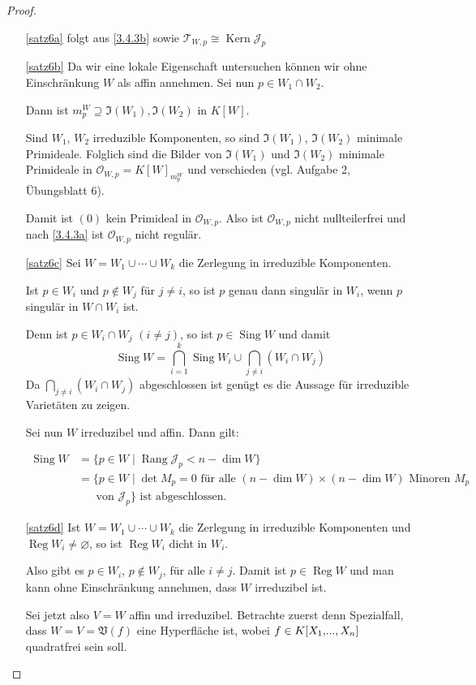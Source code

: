 \documentclass[a4paper,12pt]{scrbook}
\theoremstyle{keinenummern} %
\theoremstyle{mitnummern}
\theoremstyle{unserbeweis}
\newtheorem{proof}{Beweis}
\def\V{\mathfrak{V}}
\def\I{\mathfrak{I}}
\def\O{\mathcal{O}}
\newcommand{\J}{\mathcal{J}}
\def\T{\mathcal{T}}
\newcommand{\Kern}{\operatorname{Kern}}
\newcommand{\Rang}{\operatorname{Rang}}
\newcommand{\Sing}{\operatorname{Sing}}
\newcommand{\Reg}{\operatorname{Reg}}
\newcommand{\leer}{\ensuremath{\varnothing}}
\renewcommand{\dotsc}{\ensuremath{\!...}}
\newcommand{\polyx}[1][n]{\ensuremath%
  [X_{1},\dotsc,X_{#1}]}
\begin{document}
\begin{proof}
  \begin{enumerate}
  \item[\ref{satz6a}] folgt aus \cref{3.4.3b} sowie $\T_{W,p}\cong \Kern \J_p$
  \item[\ref{satz6b}] Da wir eine lokale Eigenschaft untersuchen können wir ohne Einschränkung $W$ als affin annehmen. Sei nun $p\in W_1\cap W_2$.

  Dann ist $m_p^W\supseteq \I(W_1),\I(W_2)$ in $K[W]$.

  Sind $W_1$, $W_2$ irreduzible Komponenten, so sind $\I(W_1)$, $\I(W_2)$ minimale Primideale. Folglich sind die Bilder von $\I(W_1)$ und $\I(W_2)$ minimale Primideale in $\O_{W,p}=K[W]_{m_p^W}$ und verschieden (vgl. Aufgabe 2, Übungsblatt 6).

  Damit ist $(0)$ kein Primideal in $\O_{W,p}$. Also ist $\O_{W,p}$ nicht nullteilerfrei und nach \cref{3.4.3a} ist $\O_{W,p}$ nicht regulär.
  \item[\ref{satz6c}] Sei $W=W_1\cup \dotsm \cup W_k$ die Zerlegung in irreduzible Komponenten.

  Ist $p\in W_i$ und $p\notin W_j$ für $j\neq i$, so ist $p$ genau dann singulär in $W_i$, wenn $p$ singulär in $W\cap W_i$ ist.

 Denn ist $p\in W_i\cap W_j$ $(i\neq j)$, so ist $p \in \Sing W$ und damit
\[\Sing W=\bigcap\limits_{i=1}^{k} \Sing W_i \cup \bigcap\limits_{j\neq i}^{}(W_i\cap W_j)\]
Da $  \bigcap\limits_{j\neq i}^{}(W_i\cap W_j)$ abgeschlossen ist genügt es die Aussage für irreduzible Varietäten zu zeigen. 

Sei nun $W$ irreduzibel und affin. Dann gilt:

\begin{align*} \Sing W&=\{p\in W \mid \Rang \J_p < n-\dim W\} \\&=\{p\in W \mid \det M_p=0 \text{ für alle }(n-\dim W)\times (n-\dim W)\text{ Minoren }M_p\\&\quad \; \text{ von }\J_p\}\text{ ist abgeschlossen.} \end{align*}
  \item[\ref{satz6d}] Ist $W=W_1\cup \dotsm \cup W_k$ die Zerlegung in irreduzible Komponenten und $\Reg W_i\neq \leer$, so ist $\Reg W_i$ dicht in $W_i$.

Also gibt es $p\in W_i$, $p\notin W_j$, für alle $i\neq j$. Damit ist $p\in \Reg W$ und man kann ohne Einschränkung annehmen, dass $W$ irreduzibel ist.

Sei jetzt also $V=W$ affin und irreduzibel. Betrachte zuerst denn Spezialfall, dass $W=V=\V(f)$ eine Hyperfläche ist, wobei $f\in K\polyx$ quadratfrei sein soll.


\end{enumerate}
\end{proof}
\end{document}
